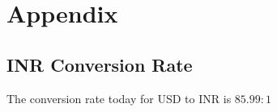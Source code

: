 \section{Appendix}
\subsection{INR Conversion Rate}\label{conv:Rupee} 
The conversion rate today for USD to INR is $85.99:1$